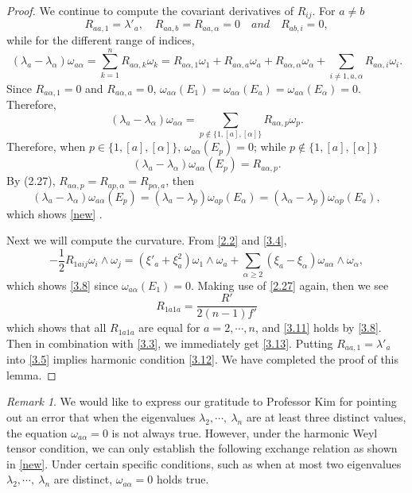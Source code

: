 \documentclass{amsart}
\theoremstyle{definition}
\theoremstyle{remark}
\newtheorem{remark}[theorem]{Remark}
\numberwithin{equation}{section}
\begin{document}
	\begin{proof}	
		We continue to compute the covariant derivatives of $R_{ij}$.
		For $a\neq b$
		\[
		R_{aa,1}=\lambda'_a,  \quad R_{aa,b}=R_{aa,\alpha}=0 \quad  and \quad R_{ab,i}=0,
		\]
		while for the different range of indices, 
		\[
		\left(\lambda_a-\lambda_\alpha \right)\omega_{a\alpha}
		= \sum_{k=1}^{n}R_{a\alpha,k}\omega_k 
		= R_{a\alpha,1}\omega_1+R_{a\alpha,a}\omega_a+R_{a\alpha,\alpha}\omega_\alpha
		+\sum_{i\neq 1,a,\alpha}R_{a\alpha,i}\omega_i.
		\]
		Since $R_{a\alpha,1}=0$ and $R_{a\alpha,a}=0$,
		$\omega_{a\alpha}(E_1)= \omega_{a\alpha}(E_a)=\omega_{a\alpha}(E_\alpha)=0$.
		Therefore, 
		\[
		\left(\lambda_a-\lambda_\alpha \right)\omega_{a\alpha}
		=\sum_{p\notin \{1,[a],[\alpha]\}}R_{a\alpha,p}\omega_p.
		\]
		Therefore, when $p\in \{1,[a],[\alpha]\}$, $\omega_{a\alpha}(E_p)=0$; while $p \notin \{1,[a],[\alpha]\}$
		\[
		\left(\lambda_a-\lambda_\alpha \right)\omega_{a\alpha}(E_p)=R_{a\alpha,p}.
		\]
		By (2.27), $R_{a\alpha,p}=R_{ap,\alpha}=R_{p\alpha,a}$,  then
		\[
		\left(\lambda_a-\lambda_\alpha \right)\omega_{a\alpha}(E_p)=\left(\lambda_a-\lambda_p\right)\omega_{ap}(E_\alpha)
		=\left(\lambda_\alpha-\lambda_p \right)\omega_{\alpha p}(E_a),
		\]
		which shows  \eqref{new} . 
		
		Next we will compute the curvature. From  \eqref{2.2} and \eqref{3.4},
		\[
		-\frac{1}{2}R_{1aij}\omega_{i}\wedge\omega_{j}=\left(\xi'_a+\xi^2_a \right)\omega_{1}\wedge\omega_{a}
		+ \sum_{\alpha\geq 2}\left(\xi_a-\xi_\alpha \right)\omega_{a\alpha}\wedge\omega_{\alpha},
		\]
		which shows \eqref{3.8} since $\omega_{a\alpha}(E_1)=0$.
		Making use of \eqref{2.27} again, then we see
		\[ 
		R_{1a1a}=\frac{R'}{2(n-1)f'} 
		\]
		which shows that all $R_{1a1a}$ are equal for $a=2, \cdots, n$, and \eqref{3.11} holds by \eqref{3.8}.
		Then in combination with \eqref{3.3}, we immediately
		get \eqref{3.13}. Putting $R_{aa,1}=\lambda'_a$ into \eqref{3.5} implies harmonic condition \eqref{3.12}.
		We have completed the proof of this lemma.
	\end{proof}
	
	\begin{remark} \label{kim}
		We would like to express our gratitude to Professor Kim for pointing out an error that when the eigenvalues $\lambda_2,\cdots,~\lambda_n$ are at least three distinct values, the equation $\omega_{a\alpha}=0$ is not always true. However, under the harmonic Weyl tensor condition, we can only establish the following exchange relation as shown in \eqref{new}.
		Under certain specific conditions, such as when at most two eigenvalues $\lambda_2,\cdots,~\lambda_n$ are distinct, $\omega_{a\alpha}=0$ holds true.
	\end{remark}
	
\end{document}
